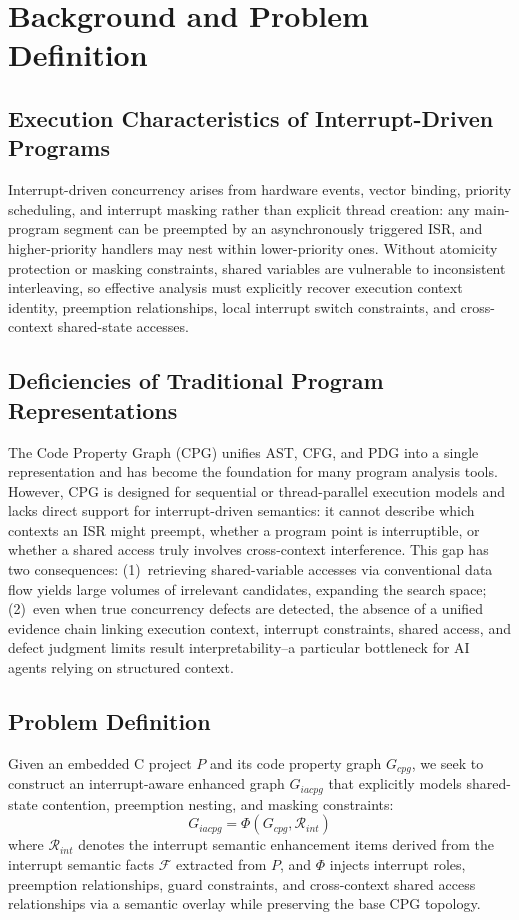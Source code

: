 \documentclass[conference]{IEEEtran}
\begin{document}
\section{Background and Problem Definition}

\subsection{Execution Characteristics of Interrupt-Driven Programs}

Interrupt-driven concurrency arises from hardware events, vector binding, priority scheduling, and interrupt masking rather than explicit thread creation: any main-program segment can be preempted by an asynchronously triggered ISR, and higher-priority handlers may nest within lower-priority ones. Without atomicity protection or masking constraints, shared variables are vulnerable to inconsistent interleaving, so effective analysis must explicitly recover execution context identity, preemption relationships, local interrupt switch constraints, and cross-context shared-state accesses.

\subsection{Deficiencies of Traditional Program Representations}

The Code Property Graph (CPG) unifies AST, CFG, and PDG into a single representation and has become the foundation for many program analysis tools. However, CPG is designed for sequential or thread-parallel execution models and lacks direct support for interrupt-driven semantics: it cannot describe which contexts an ISR might preempt, whether a program point is interruptible, or whether a shared access truly involves cross-context interference. This gap has two consequences: (1)~retrieving shared-variable accesses via conventional data flow yields large volumes of irrelevant candidates, expanding the search space; (2)~even when true concurrency defects are detected, the absence of a unified evidence chain linking execution context, interrupt constraints, shared access, and defect judgment limits result interpretability--a particular bottleneck for AI agents relying on structured context.

\subsection{Problem Definition}

Given an embedded C project $P$ and its code property graph $G_{cpg}$, we seek to construct an interrupt-aware enhanced graph $G_{iacpg}$ that explicitly models shared-state contention, preemption nesting, and masking constraints:
\begin{equation}
G_{iacpg} = \Phi(G_{cpg}, \mathcal{R}_{int})
\end{equation}
where $\mathcal{R}_{int}$ denotes the interrupt semantic enhancement items derived from the interrupt semantic facts $\mathcal{F}$ extracted from $P$, and $\Phi$ injects interrupt roles, preemption relationships, guard constraints, and cross-context shared access relationships via a semantic overlay while preserving the base CPG topology.
\end{document}
